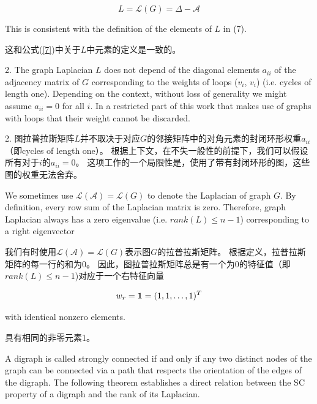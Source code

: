 \documentclass{article}
\begin{document}
\begin{equation}
    L = \mathcal{L}(G) = \Delta-\mathcal{A}
    \tag{12}
    \label{12}
\end{equation}

{\color[gray]{0.5}
\noindent This is consistent with the deﬁnition of the elements of $L$ in (7).
}

\noindent 这和公式(\ref{7})中关于$L$中元素的定义是一致的。

{\color[gray]{0.5}
 2. The graph Laplacian $L$ does not depend of the diagonal elements $a_{ii}$ of the adjacency matrix of $G$ corresponding to the weights of loops ($v_i$, $v_i$) (i.e. cycles of length one). 
Depending on the context, without loss of generality we might assume $a_{ii}=0$ for all $i$. 
In a restricted part of this work that makes use of graphs with loops that their weight cannot be discarded.
}

 2. 图拉普拉斯矩阵$L$并不取决于对应$G$的邻接矩阵中的对角元素的封闭环形权重$a_{ii}$（即cycles of length one）。
根据上下文，在不失一般性的前提下，我们可以假设所有对于$i$的$a_{ii}=0$。
这项工作的一个局限性是，使用了带有封闭环形的图，这些图的权重无法舍弃。

{\color[gray]{0.5}
We sometimes use $\mathcal{L}(\mathcal{A}) = \mathcal{L}(G)$ to denote the Laplacian of graph $G$. 
By deﬁnition, every row sum of the Laplacian matrix is zero. 
Therefore, graph Laplacian always has a zero eigenvalue (i.e. $rank(L)\le n-1$) corresponding to a right eigenvector
}

我们有时使用$\mathcal{L}(\mathcal{A}) = \mathcal{L}(G)$表示图$G$的拉普拉斯矩阵。
根据定义，拉普拉斯矩阵的每一行的和为0。
因此，图拉普拉斯矩阵总是有一个为0的特征值（即$rank(L)\le n-1$)对应于一个右特征向量

\begin{equation}
    w_r = \mathbf{1} = (1,1,\dots,1)^T \notag
\end{equation}

{\color[gray]{0.5}
\noindent with identical nonzero elements.
}

\noindent 具有相同的非零元素1。

{\color[gray]{0.5}
A digraph is called strongly connected if and only if any two distinct nodes of the graph can be connected via a path that respects the orientation of the edges of the digraph. 
The following theorem establishes a direct relation between the SC property of a digraph and the rank of its Laplacian.
}
\end{document}
